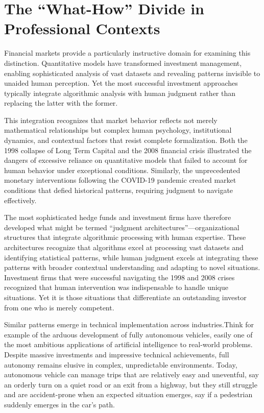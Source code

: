 \documentclass[
  Letterpaper,
]{scrbook}
\begin{document}
\section{The ``What-How'' Divide in Professional
Contexts}\label{the-what-how-divide-in-professional-contexts}

Financial markets provide a particularly instructive domain for
examining this distinction. Quantitative models have transformed
investment management, enabling sophisticated analysis of vast datasets
and revealing patterns invisible to unaided human perception. Yet the
most successful investment approaches typically integrate algorithmic
analysis with human judgment rather than replacing the latter with the
former.

This integration recognizes that market behavior reflects not merely
mathematical relationships but complex human psychology, institutional
dynamics, and contextual factors that resist complete formalization.
Both the 1998 collapse of Long Term Capital and the 2008 financial
crisis illustrated the dangers of excessive reliance on quantitative
models that failed to account for human behavior under exceptional
conditions. Similarly, the unprecedented monetary interventions
following the COVID-19 pandemic created market conditions that defied
historical patterns, requiring judgment to navigate effectively.

The most sophisticated hedge funds and investment firms have therefore
developed what might be termed ``judgment
architectures''---organizational structures that integrate algorithmic
processing with human expertise. These architectures recognize that
algorithms excel at processing vast datasets and identifying statistical
patterns, while human judgment excels at integrating these patterns with
broader contextual understanding and adapting to novel situations.
Investment firms that were successful navigating the 1998 and 2008
crises recognized that human intervention was indispensable to handle
unique situations. Yet it is those situations that differentiate an
outstanding investor from one who is merely competent.

Similar patterns emerge in technical implementation across
industries.Think for example of the arduous development of fully
autonomous vehicles, easily one of the most ambitious applications of
artificial intelligence to real-world problems. Despite massive
investments and impressive technical achievements, full autonomy remains
elusive in complex, unpredictable environments. Today, autonomous
vehicle can manage trips that are relatively easy and uneventful, say an
orderly turn on a quiet road or an exit from a highway, but they still
struggle and are accident-prone when an expected situation emerges, say
if a pedestrian suddenly emerges in the car's path.
\end{document}
